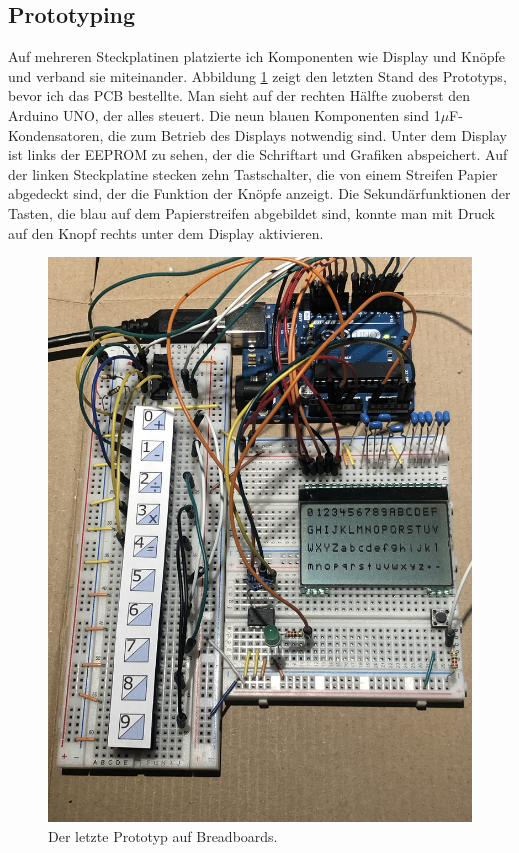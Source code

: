 \documentclass[12pt, a4paper]{report}
\begin{document}
\subsection{Prototyping}
Auf mehreren Steckplatinen platzierte ich Komponenten wie Display und Knöpfe und verband sie miteinander. Abbildung \ref{fig:prototyping} zeigt den letzten Stand des Prototyps, bevor ich das PCB bestellte. Man sieht auf der rechten Hälfte zuoberst den Arduino UNO, der alles steuert. Die neun blauen Komponenten sind 1$\mu$F-Kondensatoren, die zum Betrieb des Displays notwendig sind. Unter dem Display ist links der EEPROM zu sehen, der die Schriftart und Grafiken abspeichert. Auf der linken Steckplatine stecken zehn Tastschalter, die von einem Streifen Papier abgedeckt sind, der die Funktion der Knöpfe anzeigt. Die Sekundärfunktionen der Tasten, die blau auf dem Papierstreifen abgebildet sind, konnte man mit Druck auf den Knopf rechts unter dem Display aktivieren.
\begin{figure}[H]
\centering
\includegraphics[width=0.6\linewidth]{assets/prototype.jpg}
\caption{Der letzte Prototyp auf Breadboards.}
\label{fig:prototyping}
\end{figure}
\end{document}
